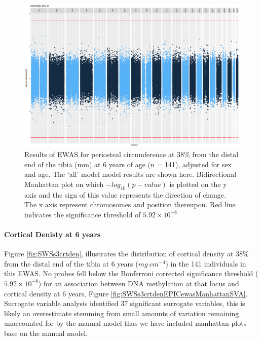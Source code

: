 \documentclass[
]{book}
\begin{document}
\begin{figure}

{\centering \includegraphics[width=0.8\linewidth]{figs/SWSs3pericEPICewasManhattanAll} 

}

\caption{Results of EWAS for periosteal circumference at 38\% from the distal end of the tibia (mm) at 6 years of age (n = 141), adjusted for sex and age. The `all' model model results are shown here. Bidirectional Manhattan plot on which \(-log_{10}(p-value)\) is plotted on the y axis and the sign of this value represents the direction of change. The x axis represent chromosomes and position thereupon. Red line indicates the significance threshold of \(5.92\times10^{-8}\)}\label{fig:SWSs3pericEPICewasManhattanSVA}
\end{figure}



\hypertarget{cortical-denisty-at-6-years}{%
\paragraph{Cortical Denisty at 6 years}\label{cortical-denisty-at-6-years}}

Figure \ref{fig:SWSs3crtden}, illustrates the distribution of cortical density at 38\% from the distal end of the tibia at 6 years (\(mg~cm^{-3}\)) in the 141 individuals in this EWAS.
No probes fell below the Bonferroni corrected significance threshold (\(5.92\times10^{-8}\)) for an association between DNA methylation at that locus and cortical density at 6 years, Figure \ref{fig:SWSs3crtdenEPICewasManhattanSVA}.
Surrogate variable analysis identified 37 significant surrogate variables, this is likely an overestimate stemming from small amounts of variation remaining unaccounted for by the manual model thus we have included manhattan plots base on the manual model.
\end{document}
